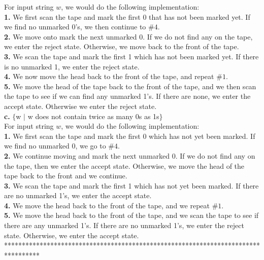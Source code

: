 \documentclass[12pt]{article}
\begin{document}
For input string $w$, we would do the following implementation: \\
\textbf{1.} We first scan the tape and mark the first 0 that has not been marked yet.
If we find no unmarked 0's, we then continue to $\#4$. \\
\textbf{2.} We move onto mark the next unmarked 0. If we do not find any on the tape,
we enter the reject state. Otherwise, we move back to the front of the tape. \\
\textbf{3.} We scan the tape and mark the first 1 which has not been marked yet. If there
is no unmarked 1, we enter the reject state. \\
\textbf{4.} We now move the head back to the front of the tape, and repeat $\#1$. \\
\textbf{5.} We move the head of the tape back to the front of the tape, and we then scan
the tape to see if we can find any unmarked 1's. If there are none, we enter the
accept state. Otherwise we enter the reject state. \\

\textbf{c.} $\{$w $\mid$ w does not contain twice as many 0s as 1s$\}$ \\

For input string $w$, we would do the following implementation: \\
\textbf{1.} We first scan the tape and mark the first 0 which has not yet been marked.
If we find no unmarked 0, we go to $\#4$. \\
\textbf{2.} We continue moving and mark the next unmarked 0. If we do not find any on
the tape, then we enter the accept state. Otherwise, we move the head of the tape back
to the front and we continue. \\
\textbf{3.} We scan the tape and mark the first 1 which has not yet been marked. If 
there are no unmarked 1's, we enter the accept state. \\
\textbf{4.} We move the head back to the front of the tape, and we repeat $\#1$. \\
\textbf{5.} We move the head back to the front of the tape, and we scan the tape
to see if there are any unmarked 1's. If there are no unmarked 1's, we enter the 
reject state. Otherwise, we enter the accept state. \\

\pagebreak
**********************************************************************************
\end{document}
